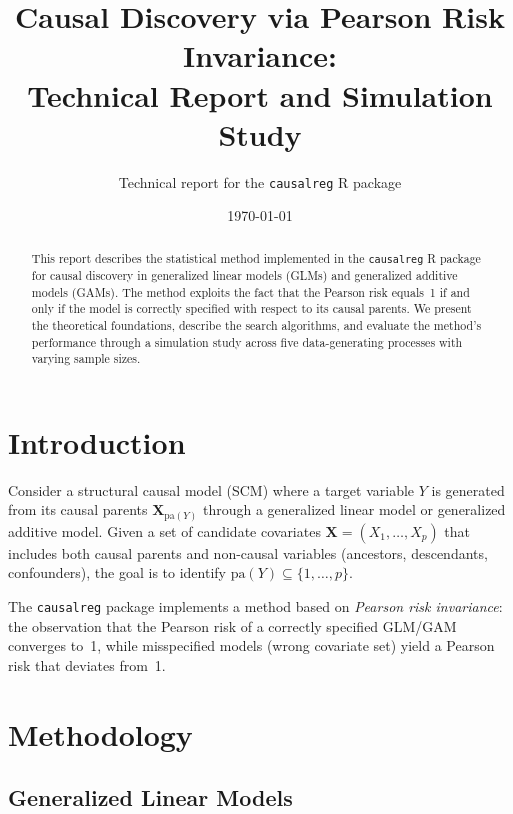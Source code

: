 \documentclass[11pt,a4paper]{article}
\title{Causal Discovery via Pearson Risk Invariance:\\
Technical Report and Simulation Study}
\author{Technical report for the \texttt{causalreg} R package}
\date{\today}
\newcommand{\pa}{\mathrm{pa}}
\begin{document}
\maketitle

\begin{abstract}
This report describes the statistical method implemented in the \texttt{causalreg} R package for causal discovery in generalized linear models (GLMs) and generalized additive models (GAMs). The method exploits the fact that the Pearson risk equals~1 if and only if the model is correctly specified with respect to its causal parents. We present the theoretical foundations, describe the search algorithms, and evaluate the method's performance through a simulation study across five data-generating processes with varying sample sizes.
\end{abstract}

\tableofcontents

\section{Introduction}

Consider a structural causal model (SCM) where a target variable $Y$ is generated from its causal parents $\mathbf{X}_{\pa(Y)}$ through a generalized linear model or generalized additive model. Given a set of candidate covariates $\mathbf{X} = (X_1, \ldots, X_p)$ that includes both causal parents and non-causal variables (ancestors, descendants, confounders), the goal is to identify $\pa(Y) \subseteq \{1, \ldots, p\}$.

The \texttt{causalreg} package \citep{vinciotti2026} implements a method based on \emph{Pearson risk invariance}: the observation that the Pearson risk of a correctly specified GLM/GAM converges to~1, while misspecified models (wrong covariate set) yield a Pearson risk that deviates from~1.

\section{Methodology}

\subsection{Generalized Linear Models}
\end{document}
